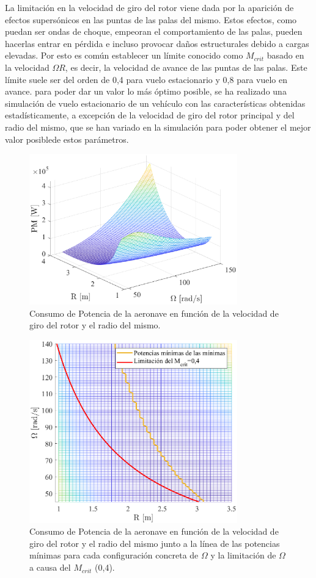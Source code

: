 La limitación en la velocidad de giro del rotor viene dada por la aparición de efectos supersónicos en las puntas de las palas del mismo. Estos efectos, como puedan ser ondas de choque, empeoran el comportamiento de las palas, pueden hacerlas entrar en pérdida e incluso provocar daños estructurales debido a cargas elevadas.
Por esto es común establecer un límite conocido como $M_{crit}$ basado en la velocidad $\Omega R$, es decir, la velocidad de avance de las puntas de las palas. Este límite suele ser del orden de 0,4 para vuelo estacionario y 0,8 para vuelo en avance. 
para poder dar un valor lo más óptimo posible, se ha realizado una simulación de vuelo estacionario de un vehículo con las características obtenidas estadísticamente, a excepción de la velocidad de giro del rotor principal y del radio del mismo, que se han variado en la simulación para poder obtener el mejor valor posiblede estos parámetros.


\begin{figure}
	\centering
	\includegraphics[width=90mm]{graficos/3d3d}
	\caption{Consumo de Potencia de la aeronave en función de la velocidad de giro del rotor y el radio del mismo.}
	\label{ORP}
\end{figure}
\begin{figure}
	\centering
	\includegraphics[width=90mm]{graficos/3d2d}
	\caption{Consumo de Potencia de la aeronave en función de la velocidad de giro del rotor y el radio del mismo junto a la línea de las potencias mínimas para cada configuración concreta de $\Omega$ y la limitación de $\Omega$ a causa del $M_{crit}$ (0,4).}
	\label{ORPM}
\end{figure}

